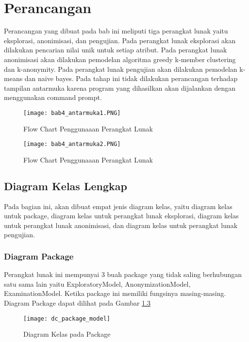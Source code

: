 \chapter{Perancangan}
\label{chap:perancangan}

Perancangan yang dibuat pada bab ini meliputi tiga perangkat lunak yaitu eksplorasi, anonimisasi, dan pengujian. Pada perangkat lunak eksplorasi akan dilakukan pencarian nilai unik untuk setiap atribut. Pada perangkat lunak anonimisasi akan dilakukan pemodelan algoritma greedy k-member clustering dan k-anonymity. Pada perangkat lunak pengujian akan dilakukan pemodelan k-means dan naive bayes. Pada tahap ini tidak dilakukan perancangan terhadap tampilan antarmuka karena program yang dihasilkan akan dijalankan dengan menggunakan command prompt.

\begin{figure}[H]
	\centering
	\texttt{[image: bab4\_antarmuka1.PNG]}
	\caption{Flow Chart Penggunaaan Perangkat Lunak}
	\label{fig:diagram_aktivitas_bab4}
\end{figure}

\begin{figure}[H]
	\centering
	\texttt{[image: bab4\_antarmuka2.PNG]}
	\caption{Flow Chart Penggunaaan Perangkat Lunak}
	\label{fig:diagram_aktivitas_bab4}
\end{figure}


\newpage
\section{Diagram Kelas Lengkap}
\label{sec:diagram_kelas_lengkap}

Pada bagian ini, akan dibuat empat jenis diagram kelas, yaitu diagram kelas untuk package, diagram kelas untuk perangkat lunak eksplorasi, diagram kelas untuk perangkat lunak anonimisasi, dan diagram kelas untuk perangkat lunak pengujian.

\subsection{Diagram Package}
\label{sec:perangkat_lunak_anonimisasi}

Perangkat lunak ini mempunyai 3 buah package yang tidak saling berhubungan satu sama lain yaitu ExploratoryModel, AnonymizationModel, ExaminationModel. Ketika package ini memiliki fungsinya masing-masing. Diagram Package dapat dilihat pada Gambar \ref{fig:dc_package_model}

\begin{figure}[H]
	\centering
	\texttt{[image: dc\_package\_model]}
	\caption{Diagram Kelas pada Package}
	\label{fig:dc_package_model}
\end{figure}

